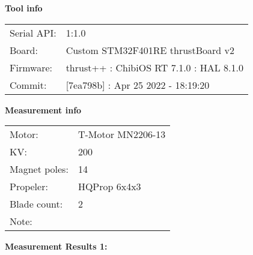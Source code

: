 \documentclass[10pt]{article}
\begin{document}
\noindent
{\large \bf Tool info}
\vspace{3mm}

\noindent
\begin{tabular}{ll}
Serial API:  & 1:1.0\\ 
Board:       & Custom STM32F401RE thrustBoard v2\\ 
Firmware:    & thrust++ : ChibiOS RT 7.1.0 : HAL 8.1.0\\ 
Commit:      & [7ea798b] : Apr 25 2022 - 18:19:20
\end{tabular}
\vspace{3mm}

\noindent
{\large \bf Measurement info}
\vspace{3mm}

\noindent
\begin{tabular}{ll}
Motor:        & T-Motor MN2206-13\\ 
KV:           & 200\\ 
Magnet poles: & 14\\ 
Propeler:     & HQProp 6x4x3\\ 
Blade count:  & 2\\ 
Note:         & 
\end{tabular}

\vspace{3mm}

\noindent
{\large \bf Measurement Results 1:}
\vspace{3mm}
\end{document}
